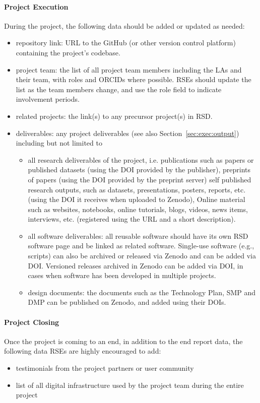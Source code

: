 \paragraph{Project Execution}
During the project, the following data should be added or updated as needed:
\begin{itemize}
   \item repository link: URL to the GitHub (or other version control platform) containing the project's codebase.
   \item project team: the list of all project team members including the LAs and their team, with roles and ORCIDs where possible. 
     RSEs should update the list as the team members change, and use the role field to indicate involvement periods.
   \item related projects: the link(s) to any precursor project(s) in RSD.
   \item deliverables: any project deliverables (see also Section~\ref{sec:exec:output}) including but not limited to
  \begin{itemize}
   \item  all research deliverables of the project, i.e. publications such as papers or published datasets (using the DOI provided by the publisher), preprints of papers (using the DOI provided by the preprint server)
        self published research outputs, such as datasets, presentations, posters, reports, etc. (using the DOI it receives when uploaded to Zenodo), Online material such as websites, notebooks, online tutorials, blogs, videos, news items, interviews, etc. (registered using the URL and a short description).
   \item all software deliverables: all reusable software should have its own RSD software page and be linked as related software. Single-use software (e.g., scripts) can also be archived or released via Zenodo and can be added via DOI. Versioned releases archived in Zenodo can be added via DOI, in cases when software has been developed in multiple projects.
   \item design documents: the documents such as the Technology Plan, SMP and DMP can be published on Zenodo, and added using their DOIs.
 \end{itemize}
 \end{itemize}
 \paragraph{Project Closing}
Once the project is coming to an end, in addition to the end report data, the following data RSEs are highly encouraged to add:
\begin{itemize}
   \item testimonials from the project partners or user community
   \item list of all digital infrastructure used by the project team during the entire project
 \end{itemize}